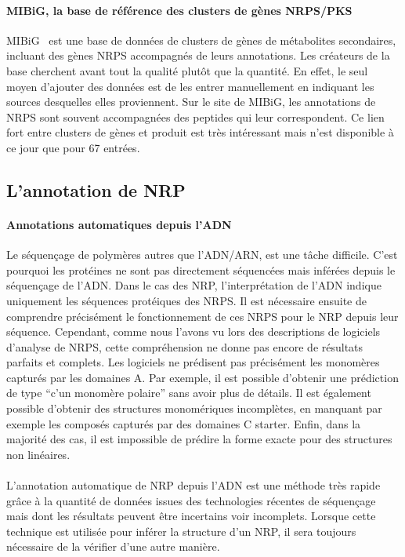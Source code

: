 \documentclass[12pt,french,twoside]{report}
\begin{document}
\paragraph{MIBiG, la base de référence des clusters de gènes NRPS/PKS}
MIBiG~\cite{medema_minimum_2015} est une base de données de clusters de gènes de métabolites secondaires, incluant des gènes NRPS accompagnés de leurs annotations.
Les créateurs de la base cherchent avant tout la qualité plutôt que la quantité.
En effet, le seul moyen d'ajouter des données est de les entrer manuellement en indiquant les sources desquelles elles proviennent.
Sur le site de MIBiG, les annotations de NRPS sont souvent accompagnées des peptides qui leur correspondent.
Ce lien fort entre clusters de gènes et produit est très intéressant mais n'est disponible à ce jour que pour 67 entrées.



\subsection{L'annotation de NRP}

\paragraph{Annotations automatiques depuis l'ADN}
Le séquençage de polymères autres que l'ADN/ARN, est une tâche difficile.
C'est pourquoi les protéines ne sont pas directement séquencées mais inférées depuis le séquençage de l'ADN.
Dans le cas des NRP, l'interprétation de l'ADN indique uniquement les séquences protéiques des NRPS.
Il est nécessaire ensuite de comprendre précisément le fonctionnement de ces NRPS pour le NRP depuis leur séquence.
Cependant, comme nous l'avons vu lors des descriptions de logiciels d'analyse de NRPS, cette compréhension ne donne pas encore de résultats parfaits et complets.
Les logiciels ne prédisent pas précisément les monomères capturés par les domaines A.
Par exemple, il est possible d'obtenir une prédiction de type ``c'un monomère polaire'' sans avoir plus de détails.
Il est également possible d'obtenir des structures monomériques incomplètes, en manquant par exemple les composés capturés par des domaines C starter.
Enfin, dans la majorité des cas, il est impossible de prédire la forme exacte pour des structures non linéaires.

\paragraph{}L'annotation automatique de NRP depuis l'ADN est une méthode très rapide grâce à la quantité de données issues des technologies récentes de séquençage mais dont les résultats peuvent être incertains voir incomplets.
Lorsque cette technique est utilisée pour inférer la structure d'un NRP, il sera toujours nécessaire de la vérifier d'une autre manière.
\end{document}
